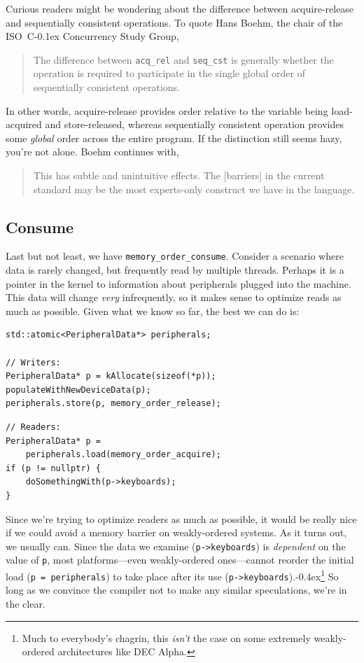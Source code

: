 \documentclass[fontsize=10pt, numbers=endperiod]{scrartcl}
\newcommand{\codesize}{\fontsize{10pt}{12pt}}
\newcommand{\punckern}{\kern-0.4ex}
\newcommand{\cpp}[1]{C\kern-0.1ex\raisebox{0.15ex}{\texttt{++}}{\addfontfeature{Numbers=LowercaseOff}#1}}
\newenvironment{colfigure}
  {\par\vspace{1\baselineskip minus 0.5\baselineskip}\noindent\minipage{\linewidth}}
  {\endminipage\vspace*{1\baselineskip minus 0.7\baselineskip}}
\begin{document}
\begin{multicols*}{2}
Curious readers might be wondering about the difference between
acquire-release and sequentially consistent operations.
To quote Hans Boehm, the chair of the ISO~\cpp{} Concurrency Study Group,
\begin{quote}
\small
The difference between \texttt{acq\_rel} and \texttt{seq\_cst} is generally
whether the operation is required to participate in the
single global order of sequentially consistent operations.
\end{quote}
In other words, acquire-release provides order relative to the variable
being load-acquired and store-released, whereas sequentially consistent
operation provides some \emph{global} order across the entire program.
If the distinction still seems hazy, you're not alone.
Boehm continues with,
\begin{quote}
\small
This has subtle and unintuitive effects.
The [barriers] in the current standard may be the most
experts-only construct we have in the language.
\end{quote}

\subsection{Consume}

Last but not least, we have \texttt{memory\_order\_consume}.
Consider a scenario where data is rarely changed,
but frequently read by multiple threads.
Perhaps it is a pointer in the kernel to information about peripherals
plugged into the machine.
This data will change \emph{very} infrequently,
so it makes sense to optimize reads as much as possible.
Given what we know so far, the best we can do is:
\begin{colfigure}
\begin{verbatim}
std::atomic<PeripheralData*> peripherals;

// Writers:
PeripheralData* p = kAllocate(sizeof(*p));
populateWithNewDeviceData(p);
peripherals.store(p, memory_order_release);
\end{verbatim}
\begin{verbatim}
// Readers:
PeripheralData* p =
    peripherals.load(memory_order_acquire);
if (p != nullptr) {
    doSomethingWith(p->keyboards);
}
\end{verbatim}
\end{colfigure}

Since we're trying to optimize readers as much as possible,
it would be really nice if we could avoid a memory barrier
on weakly-ordered systems.
As it turns out, we usually can.
Since the data we examine (\texttt{p->keyboards})
is \emph{dependent} on the value of \texttt{p},
most platforms---even weakly-ordered ones---cannot reorder the initial
load (\texttt{p = peripherals}) to take place after its use
(\texttt{p->keyboards}).\punckern\footnote{Much to everybody's chagrin,
this \emph{isn't} the case on some extremely weakly-ordered architectures like
DEC Alpha.}
So long as we convince the compiler not to make any similar speculations,
we're in the clear.


\end{multicols*}
\end{document}
